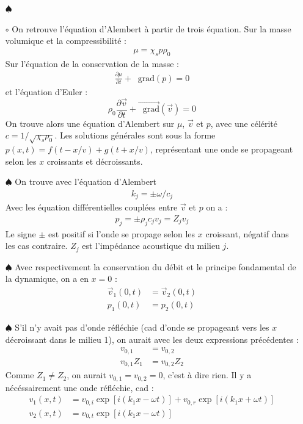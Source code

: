 \documentclass{report}
\newcommand*\grad{\mathop{}\!\mathrm{grad}}
\begin{document}
\begin{itemize}
	
	\item[$\spadesuit$] \item[$\circ$] On retrouve l'équation d'Alembert à partir de trois équation. Sur la masse volumique et la compressibilité :
	\begin{align*}
		\mu = \chi_sp\rho_0
	\end{align*}
	Sur l'équation de la conservation de la masse :
	\begin{align*}
		\frac{\partial \mu}{\partial t}+\grad(p)=0
	\end{align*}
	et l'équation d'Euler :
	\begin{equation}
		\rho_0\frac{\partial \vec{v}}{\partial t}+\vec{\grad}(\vec{v})=0
	\end{equation}
	On trouve alors une équation d'Alembert sur $\mu$, $\vec{v}$ et $p$, avec une célérité $c=1/\sqrt{\chi_s\rho_0}$.
	 Les solutions générales sont sous la forme $p(x,t)=f(t-x/v) + g(t+x/v)$, représentant une onde se propageant selon les $x$ croissants et décroissants.
	
	\item[$\spadesuit$] On trouve avec l'équation d'Alembert 
	\begin{align*}
		k_j=\pm\omega/c_j
	\end{align*}
	Avec les équation différentielles couplées entre $\vec{v}$ et $p$ on a :
	\begin{align*}
		p_j=\pm\rho_j c_j v_j = Z_jv_j
	\end{align*}
	Le signe $\pm$ est positif si l'onde se propage selon les $x$ croissant, négatif dans les cas contraire. $Z_j$ est l'impédance acoustique du milieu $j$.
	
	\item[$\spadesuit$] Avec respectivement la conservation du débit et le principe fondamental de la dynamique, on a en $x=0$ :
	\begin{align*}
		\vec{v}_1(0,t)&=\vec{v}_2(0,t) \\
		p_1(0,t)&=p_2(0,t)
	\end{align*}
	
	\item[$\spadesuit$] S'il n'y avait pas d'onde réfléchie (cad d'onde se propageant vers les $x$ décroissant dans le milieu 1), on aurait avec les deux expressions précédentes :
	\begin{align*}
		v_{0,1}&=v_{0,2} \\
		v_{0,1}Z_1&=v_{0,2}Z_2
	\end{align*}
	Comme $Z_1\neq Z_2$, on aurait $v_{0,1}=v_{0,2}=0$, c'est à dire rien. Il y a nécéssairement une onde réfléchie, cad :
	\begin{align*}
		v_1(x,t)&=v_{0,i}\exp\left[i(k_1x- \omega t) \right]+v_{0,r}\exp\left[i(k_1x+ \omega t) \right]\\
		v_2(x,t)&=v_{0,t}\exp\left[i(k_1x- \omega t) \right]
	\end{align*}
	

\end{itemize}
\end{document}

